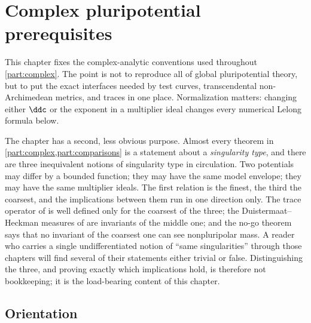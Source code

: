 \chapter{Complex pluripotential prerequisites}
%
%
%
%
%
\label{chap:complex-prerequisites}

This chapter fixes the complex-analytic conventions used throughout
\cref{part:complex}.  The point is not to reproduce all of global pluripotential
theory, but to put the exact interfaces needed by test curves,
transcendental non-Archimedean metrics, and traces in one place.
Normalization matters: changing either \(\ddc\) or the exponent in a
multiplier ideal changes every numerical Lelong formula below.

The chapter has a second, less obvious purpose.  Almost every theorem in
\cref{part:complex,part:comparisons} is a statement about a
\emph{singularity type}, and there are three inequivalent notions of
singularity type in circulation.  Two potentials may differ by a bounded
function; they may have the same model envelope; they may have the same
multiplier ideals.  The first relation is the finest, the third the
coarsest, and the implications between them run in one direction only.
The trace operator of  is well defined only
for the coarsest of the three; the Duistermaat--Heckman measures of
 are invariants of the middle one;
and the no-go theorem  says that no
invariant of the coarsest one can see nonpluripolar mass.  A reader who
carries a single undifferentiated notion of ``same singularities'' through
those chapters will find several of their statements either trivial or
false.  Distinguishing the three, and proving exactly which implications
hold, is therefore not bookkeeping; it is the load-bearing content of this
chapter.

\section{Orientation}
\label{sec:ch51-orientation}

